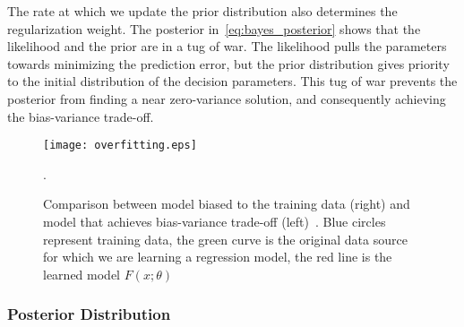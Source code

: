 %
The rate at which we update the prior distribution also determines the
regularization weight.
%
The posterior in~\eqref{eq:bayes_posterior} shows that the likelihood and the
prior are in a tug of war. The likelihood pulls the parameters towards
minimizing the prediction error, but the prior distribution gives priority to the
initial distribution of the decision parameters.
%
This tug of war prevents the posterior from finding a near zero-variance
solution, and consequently achieving the bias-variance trade-off.
%
\begin{figure}[tb]
  \centering
  \texttt{[image: overfitting.eps]}
  \caption{Comparison between model biased to the training data (right) and model
  that achieves bias-variance trade-off (left)~\cite{bishop2006pattern}. Blue
  circles represent training data, the green curve is the original data source
  for which we are learning a regression model, the red line is the learned
  model $F(x;\theta)$}.
  \label{fig:overfit}
\end{figure}

\subsubsection{Posterior Distribution}


